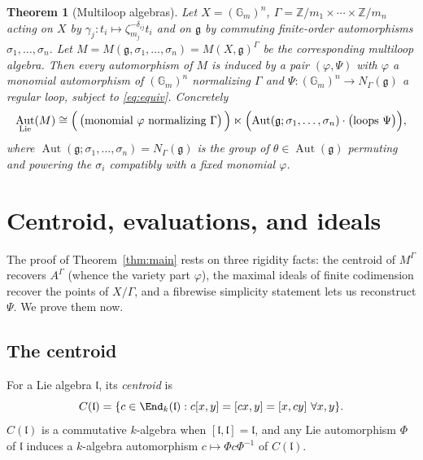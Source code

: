 \documentclass{amsart}
\newtheorem{theorem}{Theorem}
\theoremstyle{definition}
\DeclareMathOperator{\Aut}{Aut}
\newcommand{\Gm}{\mathbb{G}_m}
\newcommand{\g}{\mathfrak{g}}
\newcommand{\Z}{\mathbb{Z}}
\newcommand{\M}{M}
\begin{document}
\begin{theorem}[Multiloop algebras]\label{thm:multiloop}
Let $X=(\Gm)^n$, $\Gamma=\Z/m_1\times\cdots\times\Z/m_n$ acting on $X$ by
$\gamma_j\colon t_i\mapsto \zeta_{m_j}^{-\delta_{ij}}t_i$ and on $\g$ by
commuting finite-order automorphisms $\sigma_1,\dots,\sigma_n$.  Let
$M=M(\g,\sigma_1,\dots,\sigma_n)=\M(X,\g)^\Gamma$ be the corresponding
multiloop algebra.  Then every automorphism of $M$ is induced by a pair
$(\varphi,\Psi)$ with $\varphi$ a monomial automorphism of $(\Gm)^n$
normalizing $\Gamma$ and $\Psi\colon(\Gm)^n\to N_\Gamma(\g)$ a regular
loop, subject to \eqref{eq:equiv}.  Concretely
\[
\Aut_{\mathrm{Lie}}(M)\cong
\Bigl(\,\bigl(\text{monomial }\varphi \text{ normalizing }\Gamma\bigr)\,\Bigr)
\ltimes
\Bigl(\Aut(\g;\sigma_1,\dots,\sigma_n)\cdot
\bigl(\text{loops }\Psi\bigr)\Bigr),
\]
where $\Aut(\g;\sigma_1,\dots,\sigma_n)=N_\Gamma(\g)$ is the group of
$\theta\in\Aut(\g)$ permuting and powering the $\sigma_i$ compatibly with a
fixed monomial $\varphi$.
\end{theorem}

\section{Centroid, evaluations, and ideals}\label{sec:central}

The proof of Theorem~\ref{thm:main} rests on three rigidity facts:
the centroid of $\M^\Gamma$ recovers $A^\Gamma$ (whence the variety part
$\varphi$), the maximal ideals of finite codimension recover the points of
$X/\Gamma$, and a fibrewise simplicity statement lets us reconstruct
$\Psi$.  We prove them now.

\subsection{The centroid}
For a Lie algebra $\mathfrak l$, its \emph{centroid} is
\[
C(\mathfrak l)=\{c\in\End_k(\mathfrak l):
c[x,y]=[cx,y]=[x,cy]\ \forall x,y\}.
\]
$C(\mathfrak l)$ is a commutative $k$-algebra when $[\mathfrak l,\mathfrak
l]=\mathfrak l$, and any Lie automorphism $\Phi$ of $\mathfrak l$ induces a
$k$-algebra automorphism $c\mapsto\Phi c\Phi^{-1}$ of $C(\mathfrak l)$.
\end{document}
